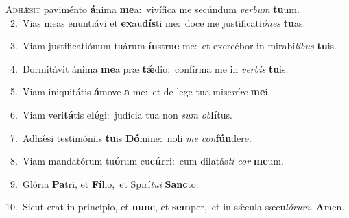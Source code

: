 \lettrine{\initial\textcolor{\initialcolor}{A}}{dhǽsit} paviménto \textbf{á}\-nima \textbf{me}\-a:~\star vivífica me secúndum \textit{ver}\-\textit{bum} \textbf{tu}\-um.\\
{\numbfont\textcolor{\numbcolor}{~2.}}~Vias meas enuntiávi et \textbf{ex}\-au\-\textbf{dís}\-ti me:~\star doce me justificati\-\textit{ó}\-\textit{nes} \textbf{tu}\-as.\par
{\numbfont\textcolor{\numbcolor}{~3.}}~Viam justificatiónum tuárum \textbf{ín}\-stru\textbf{e} me:~\star et exercébor in mirabí\-\textit{li}\-\textit{bus} \textbf{tu}\-is.\par
{\numbfont\textcolor{\numbcolor}{~4.}}~Dormitávit ánima \textbf{me}\-a præ \textbf{tǽ}\-dio:~\star confírma me in \textit{ver}\-\textit{bis} \textbf{tu}\-is.\par
{\numbfont\textcolor{\numbcolor}{~5.}}~Viam iniquitátis \textbf{á}\-move \textbf{a} me:~\star et de lege tua mise\-\textit{ré}\-\textit{re} \textbf{me}\-i.\par
{\numbfont\textcolor{\numbcolor}{~6.}}~Viam veri\-\textbf{tá}\-tis e\-\textbf{lé}\-gi:~\star judícia tua non \textit{sum} \textit{ob}\-\textbf{lí}tus.\par
{\numbfont\textcolor{\numbcolor}{~7.}}~Adhǽsi testimóniis \textbf{tu}\-is \textbf{Dó}\-mine:~\star noli \textit{me} \textit{con}\-\textbf{fún}dere.\par
{\numbfont\textcolor{\numbcolor}{~8.}}~Viam mandatórum tu\-\textbf{ó}\-rum cu\-\textbf{cúr}\-ri:~\star cum dilatás\textit{ti} \textit{cor} \textbf{me}\-um.\par
{\numbfont\textcolor{\numbcolor}{~9.}}~Glória \textbf{Pa}\-tri, et \textbf{Fí}\-lio,~\star et Spirí\-\textit{tu}\-\textit{i} \textbf{Sanc}\-to.\par
{\numbfont\textcolor{\numbcolor}{10.}}~Sicut erat in princípio, et \textbf{nunc}\-, et \textbf{sem}\-per,~\star et in sǽcula sæcu\-\textit{ló}\-\textit{rum}. \textbf{A}\-men.\par
